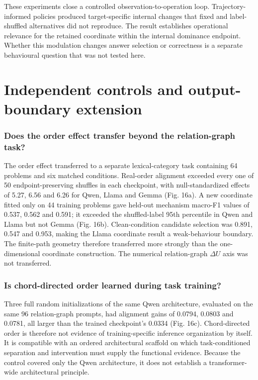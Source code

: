 \documentclass[11pt]{article}
\begin{document}
These experiments close a controlled observation-to-operation loop. Trajectory-informed policies produced target-specific internal changes that fixed and label-shuffled alternatives did not reproduce. The result establishes operational relevance for the retained coordinate within the internal dominance endpoint. Whether this modulation changes answer selection or correctness is a separate behavioural question that was not tested here.


\section{Independent controls and output-boundary extension}
\subsubsection*{Does the order effect transfer beyond the relation-graph task?}
The order effect transferred to a separate lexical-category task containing 64 problems and six matched conditions. Real-order alignment exceeded every one of 50 endpoint-preserving shuffles in each checkpoint, with null-standardized effects of 5.27, 6.56 and 6.26 for Qwen, Llama and Gemma (Fig. 16a). A new coordinate fitted only on 44 training problems gave held-out mechanism macro-F1 values of 0.537, 0.562 and 0.591; it exceeded the shuffled-label 95th percentile in Qwen and Llama but not Gemma (Fig. 16b). Clean-condition candidate selection was 0.891, 0.547 and 0.953, making the Llama coordinate result a weak-behaviour boundary. The finite-path geometry therefore transferred more strongly than the one-dimensional coordinate construction. The numerical relation-graph $\Delta U$ axis was not transferred.

\subsubsection*{Is chord-directed order learned during task training?}
Three full random initializations of the same Qwen architecture, evaluated on the same 96 relation-graph prompts, had alignment gains of 0.0794, 0.0803 and 0.0781, all larger than the trained checkpoint's 0.0334 (Fig. 16c). Chord-directed order is therefore not evidence of training-specific inference organization by itself. It is compatible with an ordered architectural scaffold on which task-conditioned separation and intervention must supply the functional evidence. Because the control covered only the Qwen architecture, it does not establish a transformer-wide architectural principle.
\end{document}
